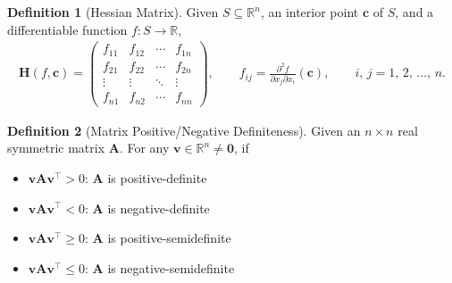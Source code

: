 \documentclass[12pt]{extarticle}
\newcommand{\ds}{\displaystyle}
\theoremstyle{definition}
\newtheorem*{dfn}{Definition}
\newcommand{\vv}{\mathbf{v}}
\newcommand{\vc}{\mathbf{c}}
\newcommand{\vH}{\mathbf{H}}
\newcommand{\vA}{\mathbf{A}}
\newcommand{\vZero}{\mathbf{0}}
\begin{document}
\begin{dfn}[Hessian Matrix]
  Given $\ds S\subseteq\mathbb{R}^n$, an interior point $\vc$ of $S$, and a differentiable function $\ds f:S\to\mathbb{R}$, 
  \begin{align*}
    \vH(f, \vc) = \begin{pmatrix}f_{11} & f_{12} & \cdots & f_{1n} \\ f_{21} & f_{22} & \cdots & f_{2n} \\ \vdots & \vdots & \ddots & \vdots \\ f_{n1} & f_{n2} & \cdots & f_{nn}\end{pmatrix}, \qquad f_{ij} = \frac{\partial^2 f}{\partial x_j\partial x_i}(\vc), \qquad i,\,j = 1,\,2,\,\ldots,\,n.
  \end{align*}
\end{dfn}

\begin{dfn}[Matrix Positive/Negative Definiteness] 
  Given an $n\times n$ real symmetric matrix $\vA$. For any $\ds\vv\in\mathbb{R}^n\ne\vZero$, if 
  \begin{multicols}{2}
    \begin{itemize}\setlength\itemsep{0em}
      \item $\ds\vv\vA\vv^\top > 0$: $\vA$ is positive-definite
      \item $\ds\vv\vA\vv^\top < 0$: $\vA$ is negative-definite
      \item $\ds\vv\vA\vv^\top \geqslant 0$: $\vA$ is positive-semidefinite
      \item $\ds\vv\vA\vv^\top \leqslant 0$: $\vA$ is negative-semidefinite
    \end{itemize}
  \end{multicols}
\end{dfn}
\end{document}
